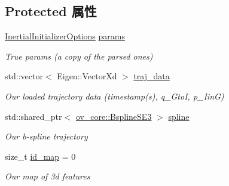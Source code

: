 \subsection*{Protected 属性}
\begin{DoxyCompactItemize}
\item 
\mbox{\label{classov__init_1_1SimulatorInit_a372edd6c98642b8aabb583dbf11140f2}} 
\hyperlink{structov__init_1_1InertialInitializerOptions}{Inertial\+Initializer\+Options} \hyperlink{classov__init_1_1SimulatorInit_a372edd6c98642b8aabb583dbf11140f2}{params}
\begin{DoxyCompactList}\small\item\em True params (a copy of the parsed ones) \end{DoxyCompactList}\item 
\mbox{\label{classov__init_1_1SimulatorInit_abf0cb10b2d9ec0e5688071e40490ca01}} 
std\+::vector$<$ Eigen\+::\+Vector\+Xd $>$ \hyperlink{classov__init_1_1SimulatorInit_abf0cb10b2d9ec0e5688071e40490ca01}{traj\+\_\+data}
\begin{DoxyCompactList}\small\item\em Our loaded trajectory data (timestamp(s), q\+\_\+\+GtoI, p\+\_\+\+IinG) \end{DoxyCompactList}\item 
\mbox{\label{classov__init_1_1SimulatorInit_a40735548035cb62e36f9aac82921d8d3}} 
std\+::shared\+\_\+ptr$<$ \hyperlink{classov__core_1_1BsplineSE3}{ov\+\_\+core\+::\+Bspline\+S\+E3} $>$ \hyperlink{classov__init_1_1SimulatorInit_a40735548035cb62e36f9aac82921d8d3}{spline}
\begin{DoxyCompactList}\small\item\em Our b-\/spline trajectory \end{DoxyCompactList}\item 
\mbox{\label{classov__init_1_1SimulatorInit_a2fb7a28d93c7b4d38d95bcaf13ecbef8}} 
size\+\_\+t \hyperlink{classov__init_1_1SimulatorInit_a2fb7a28d93c7b4d38d95bcaf13ecbef8}{id\+\_\+map} = 0
\begin{DoxyCompactList}\small\item\em Our map of 3d features \end{DoxyCompactList}\item 

\end{DoxyCompactItemize}

